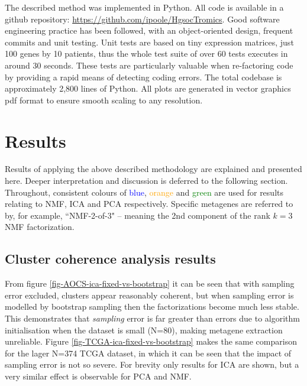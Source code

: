 \documentclass[draft, tikz, 12pt,a4paper,oneside,fleqn]{article}
\begin{document}
The described method was implemented in Python.
All code is available in a github repository: \url{https://github.com/ipoole/HgsocTromics}.  Good software engineering practice has been followed, with an object-oriented design, frequent commits and unit testing.  Unit tests are based on tiny expression matrices, just 100 genes by 10 patients, thus the whole test suite of over 60 tests executes in around 30 seconds.  These tests are particularly valuable when re-factoring code by providing a rapid means of detecting coding errors.  The total codebase is approximately 2,800 lines of Python.  All plots are generated in vector graphics pdf format to ensure smooth scaling to any resolution. 



\afterpage{\clearpage}

\section{Results}

Results of applying the above described methodology are explained and presented here.   Deeper interpretation and discussion is deferred to the following section.  Throughout, consistent colours of \textcolor{blue}{blue}, \textcolor{orange}{orange} and \textcolor{green}{green} are used for results relating to NMF, ICA and PCA respectively.  Specific metagenes are referred to by, for example, ``NMF-2-of-3" -- meaning the 2nd component of the rank $k=3$ NMF factorization.

\subsection{Cluster coherence analysis results}

From figure \ref{fig-AOCS-ica-fixed-vs-bootstrap} it can be seen that with sampling error excluded, clusters appear reasonably coherent, but when sampling error is modelled by bootstrap sampling then  the factorizations become much less stable.  This demonstrates that \emph{sampling} error is far greater than errors due to algorithm initialisation when the dataset is small (N=80), making metagene extraction unreliable.   Figure  \ref{fig-TCGA-ica-fixed-vs-bootstrap} makes the same comparison for the lager N=374 TCGA dataset, in which it can be seen that the impact of sampling error is not so severe.  For brevity only results for ICA are shown, but a very similar effect is observable for PCA and NMF.   
\end{document}
